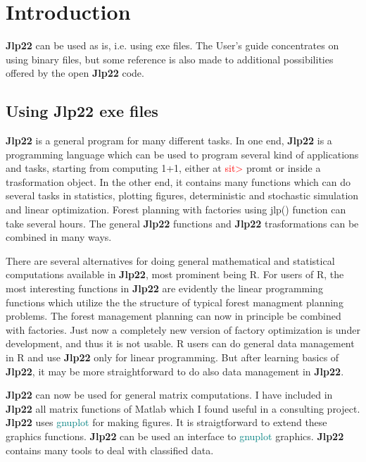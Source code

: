 \section{Introduction} 
\label{intro} 
\textbf{Jlp22} can be used as is, i.e. using exe files. The User's guide concentrates 
on using binary files, but some reference is also made to additional possibilities offered 
by the open \textbf{Jlp22} code. 
\subsection{Using \textbf{Jlp22} exe files} 
\label{intro1} 
\textbf{Jlp22} is a general program for many different tasks. In one end, \textbf{Jlp22} is a programming language which 
can be used to program several kind of applications and tasks, starting from computing 1+1, either 
at \textcolor{Red}{sit>} promt or inside a trasformation object. 
In the other end, it contains many functions which 
can do several tasks in statistics, plotting figures, 
deterministic and stochastic simulation and linear optimization. Forest planning with factories 
using \textcolor{VioletRed}{jlp}() function can take several hours. 
The general \textbf{Jlp22} functions and \textbf{Jlp22} trasformations can be combined in many ways. 
 
There are several alternatives for doing general mathematical and statistical 
computations available in \textbf{Jlp22}, most prominent being R. For  users of R, the most interesting 
functions in \textbf{Jlp22} are evidently the linear programming functions which utilize the the structure 
of typical forest managment planning problems. The forest management planning can now 
in principle be combined with factories. Just now a completely new version of factory optimization 
is under development, and thus it is not usable. R users can do general data management in R and use 
\textbf{Jlp22} only for linear programming. But after learning basics of \textbf{Jlp22}, it may be more 
straightforward to do also data management in \textbf{Jlp22}. 
 
\textbf{Jlp22} can now be used for general matrix computations. I have included in \textbf{Jlp22} all matrix functions of 
Matlab which I found useful in a consulting project. \textbf{Jlp22} uses \textcolor{teal}{gnuplot} for making figures. 
It is straigtforward to extend these graphics functions. \textbf{Jlp22} can be used an 
interface to \textcolor{teal}{gnuplot} graphics.  \textbf{Jlp22} contains many tools to deal with classified data. 
 
